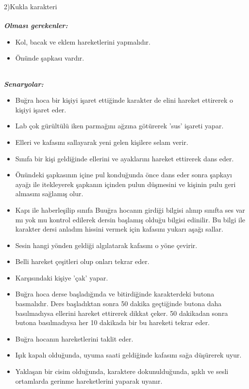 \documentclass[11pt]{article}
\begin{document}
{\Large 2)Kukla karakteri}
\\\\
\textbf{\textit{Olması gerekenler:}}\\
\begin{itemize}
\item Kol, bacak ve eklem hareketlerini yapmalıdır.\\
\item Önünde şapkası vardır.\\\\
\end{itemize}
\textbf{\textit{Senaryolar:}}\\
\begin{itemize}
\item Buğra hoca bir kişiyi işaret ettiğinde karakter de elini hareket ettirerek o kişiyi işaret eder.\\
\item Lab çok gürültülü iken parmağını ağzına götürerek 'sus' işareti yapar.\\
\item Elleri ve kafasını sallayarak yeni gelen kişilere selam verir.\\
\item Sınıfa bir kişi geldiğinde ellerini ve ayaklarını hareket ettirerek dans eder.\\
\item Önündeki şapkasının içine pul konduğunda önce dans eder sonra şapkayı ayağı ile itekleyerek şapkanın içinden pulun düşmesini ve kişinin pulu geri almasını sağlamış olur.\\
\item Kapı ile haberleşilip sınıfa Buuğra hocanın girdiği bilgisi alınıp sınıfta ses var mı yok mu kontrol edilerek dersin başlamış olduğu bilgisi edinilir. Bu bilgi ile karakter dersi anladım hissini vermek için kafasını yukarı aşağı sallar.\\
\item Sesin hangi yönden geldiği algılatarak kafasını o yöne çevirir.\\
\item Belli hareket çeşitleri olup onları tekrar eder.\\
\item Karşısındaki kişiye 'çak' yapar.\\
\item Buğra hoca derse başladığında ve bitirdiğinde karakterdeki butona basmalıdır. Ders başladıktan sonra 50 dakika geçtiğinde butona daha basılmadıysa ellerini hareket ettirerek dikkat çeker. 50 dakikadan sonra butona basılmadıysa her 10 dakikada bir bu hareketi tekrar eder.\\
\item Buğra hocanın hareketlerini taklit eder.\\
\item Işık kapalı olduğunda, uyuma saati geldiğinde kafasını sağa düşürerek uyur.\\
\item Yaklaşan bir cisim olduğunda, karaktere dokunulduğunda, ışıklı ve sesli ortamlarda gerinme hareketlerini yaparak uyanır.\\\\
\end{itemize}
\end{document}
